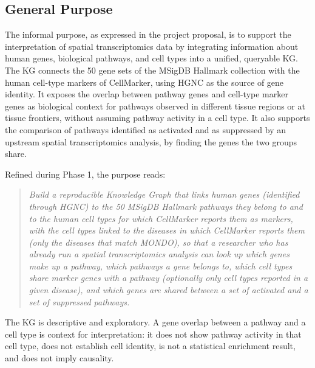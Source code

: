 \subsection{General Purpose}

The informal purpose, as expressed in the project proposal, is to support the interpretation of spatial transcriptomics data by integrating information about human genes, biological pathways, and cell types into a unified, queryable KG. The KG connects the 50 gene sets of the MSigDB Hallmark collection with the human cell-type markers of CellMarker, using HGNC as the source of gene identity. It exposes the overlap between pathway genes and cell-type marker genes as biological context for pathways observed in different tissue regions or at tissue frontiers, without assuming pathway activity in a cell type. It also supports the comparison of pathways identified as activated and as suppressed by an upstream spatial transcriptomics analysis, by finding the genes the two groups share.

\noindent Refined during Phase 1, the purpose reads:

\begin{quote}
\emph{Build a reproducible Knowledge Graph that links human genes (identified through HGNC) to the 50 MSigDB Hallmark pathways they belong to and to the human cell types for which CellMarker reports them as markers, with the cell types linked to the diseases in which CellMarker reports them (only the diseases that match MONDO), so that a researcher who has already run a spatial transcriptomics analysis can look up which genes make up a pathway, which pathways a gene belongs to, which cell types share marker genes with a pathway (optionally only cell types reported in a given disease), and which genes are shared between a set of activated and a set of suppressed pathways.}
\end{quote}

\noindent The KG is descriptive and exploratory. A gene overlap between a pathway and a cell type is context for interpretation: it does not show pathway activity in that cell type, does not establish cell identity, is not a statistical enrichment result, and does not imply causality.
